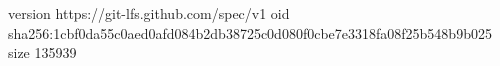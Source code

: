 version https://git-lfs.github.com/spec/v1
oid sha256:1cbf0da55c0aed0afd084b2db38725c0d080f0cbe7e3318fa08f25b548b9b025
size 135939
